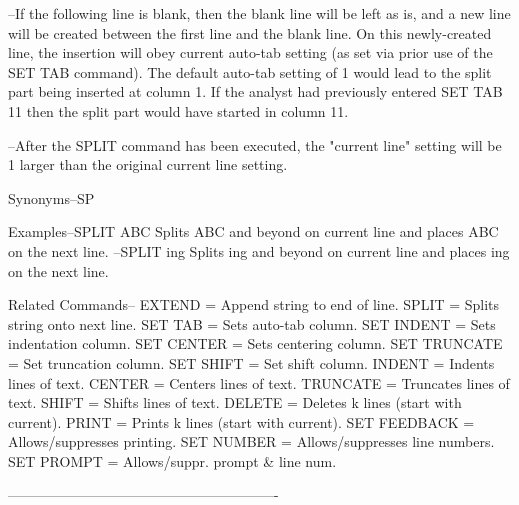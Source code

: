         --If the following line is blank, then
          the blank line will be left as is,
          and a new line will be created between
          the first line and the blank line.
          On this newly-created line, the
          insertion will obey current
          auto-tab setting (as set via
          prior use of the SET TAB command).
          The default auto-tab setting of 1
          would lead to the split part
          being inserted at column 1.  If the
          analyst had previously entered
             SET TAB 11
          then the split part would have started
          in column 11.
 
        --After the SPLIT command has
          been executed, the "current line"
          setting will be 1 larger than
          the original current line setting.
 
Synonyms--SP
 
Examples--SPLIT ABC          Splits ABC and beyond
                             on current line and
                             places ABC on the next line.
        --SPLIT ing          Splits   ing    and beyond
                             on current line and
                             places    ing    on the next line.
 
Related Commands--
          EXTEND          = Append string to end of line.
          SPLIT           = Splits string onto next line.
          SET TAB         = Sets auto-tab column.
          SET INDENT      = Sets indentation column.
          SET CENTER      = Sets centering column.
          SET TRUNCATE    = Set truncation column.
          SET SHIFT       = Set shift column.
          INDENT          = Indents lines of text.
          CENTER          = Centers lines of text.
          TRUNCATE        = Truncates lines of text.
          SHIFT           = Shifts lines of text.
          DELETE          = Deletes k lines (start with current).
          PRINT           = Prints k lines (start with current).
          SET FEEDBACK    = Allows/suppresses printing.
          SET NUMBER      = Allows/suppresses line numbers.
          SET PROMPT      = Allows/suppr. prompt & line num.
 
----------------------------------------------------------
 
 
 
 
 
 
 
 
 
 
 
 
 
 
 
